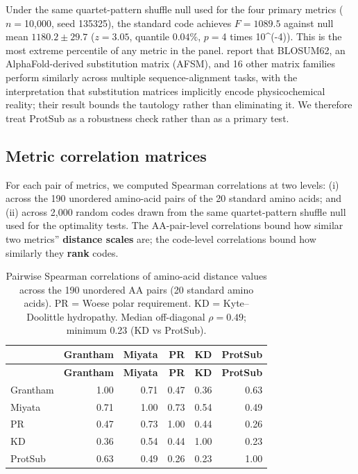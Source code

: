 \documentclass[preprint,11pt,authoryear,a4paper]{elsarticle}
\begin{document}
Under the same quartet-pattern shuffle null used for the four primary
metrics (\(n =\)10,000, seed 135325), the standard code achieves
\(F = 1089.5\) against null mean \(1180.2 \pm 29.7\) (\(z = 3.05\),
quantile \(0.04\%\), \(p =\)4 times 10\^{}(-4)\(\)). This is the most
extreme percentile of any metric in the panel. \citep{buschmann2026}
report that BLOSUM62, an AlphaFold-derived substitution matrix (AFSM),
and 16 other matrix families perform similarly across multiple
sequence-alignment tasks, with the interpretation that substitution
matrices implicitly encode physicochemical reality; their result bounds
the \citep{digiulio2001} tautology rather than eliminating it. We
therefore treat ProtSub as a robustness check rather than as a primary
test.

\subsection{Metric correlation matrices}

For each pair of metrics, we computed Spearman correlations at two
levels: (i) across the 190 unordered amino-acid pairs of the 20 standard
amino acids; and (ii) across 2,000 random codes drawn from the same
quartet-pattern shuffle null used for the optimality tests. The
AA-pair-level correlations bound how similar two metrics''
\textbf{distance scales} are; the code-level correlations bound how
similarly they \textbf{rank} codes.

\begin{longtable}[]{@{}lrrrrr@{}}
\caption{Pairwise Spearman correlations of amino-acid distance values
across the 190 unordered AA pairs (20 standard amino acids). PR = Woese
polar requirement. KD = Kyte--Doolittle hydropathy. Median off-diagonal
\(\rho = 0.49\); minimum 0.23 (KD vs ProtSub).}\tabularnewline
\toprule\noalign{}
& \textbf{Grantham} & \textbf{Miyata} & \textbf{PR} & \textbf{KD} &
\textbf{ProtSub} \\
\midrule\noalign{}
\endfirsthead
\toprule\noalign{}
& \textbf{Grantham} & \textbf{Miyata} & \textbf{PR} & \textbf{KD} &
\textbf{ProtSub} \\
\midrule\noalign{}
\endhead
\bottomrule\noalign{}
\endlastfoot
Grantham & 1.00 & 0.71 & 0.47 & 0.36 & 0.63 \\
Miyata & 0.71 & 1.00 & 0.73 & 0.54 & 0.49 \\
PR & 0.47 & 0.73 & 1.00 & 0.44 & 0.26 \\
KD & 0.36 & 0.54 & 0.44 & 1.00 & 0.23 \\
ProtSub & 0.63 & 0.49 & 0.26 & 0.23 & 1.00 \\
\end{longtable}
\end{document}
